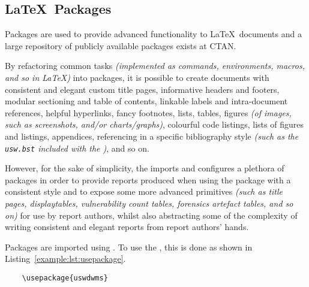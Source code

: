 \subsection{\LaTeX\ Packages}
Packages are used to provide advanced functionality to \LaTeX\ documents and a large repository of publicly available packages exists at CTAN.

By refactoring common tasks \textit{(implemented as commands, environments, macros, and so in \LaTeX{})} into packages, it is possible to create documents with consistent and elegant custom title pages, informative headers and footers, modular sectioning and table of contents, linkable labels and intra-document references, helpful hyperlinks, fancy footnotes, lists, tables, figures \textit{(of images, such as screenshots, and/or charts/graphs)}, colourful code listings, lists of figures and listings, appendices, referencing in a specific bibliography style \textit{(such as the \texttt{usw.bst} included with the \uswdwmspkg{})}, and so on.

However, for the sake of simplicity, the \uswdwmspkg{} imports and configures a plethora of packages in order to provide reports produced when using the package with a consistent style and to expose some more advanced primitives \textit{(such as title pages, displaytables, vulnerability count tables, forensics artefact tables, and so on)} for use by report authors, whilst also abstracting some of the complexity of writing consistent and elegant reports from report authors' hands.

Packages are imported using . To use the \uswdwmspkg{}, this is done as shown in Listing~\ref{example:lst:usepackage}.


\begin{listing}[H]
  \captionsetup{skip=\skiplistingcaptionlen}
  \begin{verbatim}
    \usepackage{uswdwms}
  \end{verbatim}
  \caption{\LaTeX\ \texttt{\textbackslash usepackage} command example}
  \label{example:lst:usepackage}
\end{listing}
